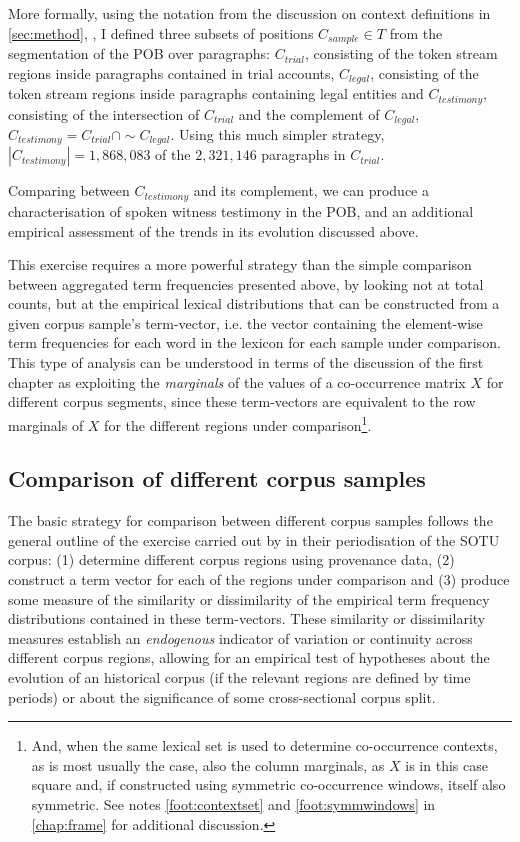 More formally, using the notation from the discussion on context definitions in \autoref{sec:method}, , I defined three subsets of positions $C_{sample} \in T$ from the segmentation of the POB over paragraphs: $C_{trial}$, consisting of the token stream regions inside paragraphs contained in trial accounts, $C_{legal}$, consisting of the token stream regions inside paragraphs containing legal entities and $C_{testimony}$, consisting of the intersection of $C_{trial}$ and the complement of $C_{legal}$, $C_{testimony} = C_{trial} \cap \sim C_{legal}$.
Using this much simpler strategy, $|C_{testimony}| = 1,868,083$ of the $2,321,146$ paragraphs in $C_{trial}$.

Comparing between $C_{testimony}$ and its complement, we can produce a characterisation of spoken witness testimony in the POB, and an additional empirical assessment of the trends in its evolution discussed above.

This exercise requires a more powerful strategy than the simple comparison between aggregated term frequencies presented above, by looking not at total counts, but at the empirical lexical distributions that can be constructed from a given corpus sample's term-vector, i.e. the vector containing the element-wise term frequencies for each word in the lexicon for each sample under comparison.
This type of analysis can be understood in terms of the discussion of the first chapter as exploiting the \emph{marginals} of the values of a co-occurrence matrix $X$ for different corpus segments, since these term-vectors are equivalent to the row marginals of $X$ for the different regions under comparison\footnote{
    \label{foot:xsymm}
    And, when the same lexical set is used to determine co-occurrence contexts, as is most usually the case, also the column marginals, as $X$ is in this case square and, if constructed using symmetric co-occurrence windows, itself also symmetric.
    See notes \ref{foot:contextset} and \ref{foot:symmwindows} in \autoref{chap:frame} for additional discussion.
}.

\subsection{Comparison of different corpus samples}

The basic strategy for comparison between different corpus samples follows the general outline of the exercise carried out by \citet{rule2015} in their periodisation of the SOTU corpus: (1) determine different corpus regions using provenance data, (2) construct a term vector for each of the regions under comparison and (3) produce some measure of the similarity or dissimilarity of the empirical term frequency distributions contained in these term-vectors. These similarity or dissimilarity measures establish an \emph{endogenous} indicator of variation or continuity across different corpus regions, allowing for an empirical test of hypotheses about the evolution of an historical corpus (if the relevant regions are defined by time periods) or about the significance of some cross-sectional corpus split.

